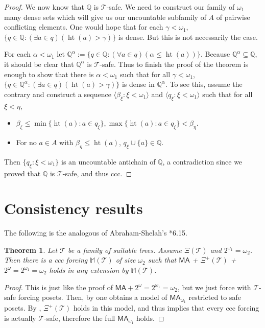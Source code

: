 \documentclass[a4paper,noamsfonts]{amsart}
\newtheorem{theorem}{Theorem}[section]
\theoremstyle{definition}
\newcommand{\Q}{\mathbb{Q}}
\newcommand{\seb}{\subseteq}
\newcommand{\tup}[1]{\langle#1\rangle}
\newcommand{\MA}{\textsf{MA}}
\newcommand{\1}{\mathbbm{1}}
\newcommand{\M}{\mathbb{M}}
\newcommand{\T}{\mathcal{T}}
\newcommand{\prop}{\Xi}
\newcommand{\propp}{\prop^{+}}
\DeclareMathOperator{\hht}{ht}
\begin{document}
\begin{proof}
  We now know that $\Q$ is $\T$-safe. We need to construct
  our family of $\omega_{1}$ many dense sets which will give us
  our uncountable subfamily of $A$ of pairwise conflicting elements.
  One would hope that
  for each $\gamma < \omega_{1}$,
  $\{q \in \Q : (\exists a \in q)(\hht(a) > \gamma)\}$ is dense. But this
  is not necessarily the case.

  For each $\alpha < \omega_{1}$ let
  $\Q^{\alpha} := \{q \in \Q : (\forall a \in q)(\alpha \le \hht(a))\}$.
  Because $\Q^{\alpha} \seb \Q$, it should be clear that $\Q^{\alpha}$
  is $\T$-safe. Thus to finish the proof of the theorem
  is enough to show that there is $\alpha < \omega_{1}$ such that
  for all $\gamma < \omega_{1}$,
  $\{q \in \Q^{\alpha} : (\exists a \in q)(\hht(a) > \gamma)\}$
  is dense in $\Q^{\alpha}$. To see this, assume the contrary
  and construct
  a sequence $\tup{\beta_{\xi} : \xi < \omega_{1}}$ and
  $\tup{q_{\xi} : \xi < \omega_{1}}$ such that for all $\xi < \eta$,
  \begin{itemize}
    \item $\beta_{\xi} \le \min\{\hht(a) : a \in q_{\xi}\},
    \max \{\hht(a) : a \in q_{\xi}\} < \beta_{\eta}$.
    \item For no $a \in A$ with $\beta_{\eta} \le \hht(a)$,
    $q_{\xi} \cup \{a\} \in \Q$. 
  \end{itemize}
  Then $\{q_{\xi} : \xi < \omega_{1}\}$ is an uncountable antichain
  of $\Q$, a contradiction since we proved that $\Q$ is $\T$-safe,
  and thus ccc.
\end{proof}

\section{Consistency results}

The following is the analogous of Abraham-Shelah's \cite{ShelahAbraham}*{6.15}.

\begin{theorem}\label{thm:ma+psi}
  Let $\T$ be a family of suitable trees. Assume
  $\prop(\T)$ and $2^{\omega_{1}} = \omega_{2}$.
  Then
  there is a ccc forcing $\M(\T)$ of size $\omega_{2}$
  such that
  $\MA$ + $\propp(\T)$ + $2^{\omega} = 2^{\omega_{1}} = \omega_{2}$
  holds in any extension by
  $\M(\T)$.
\end{theorem}
\begin{proof}
  This is just like the proof of $\MA + 2^{\omega} = 2^{\omega_{1}} = \omega_{2}$,
  but we just force with $\T$-safe forcing posets. Then, by
  one obtains a model
  of $\MA_{\omega_{1}}$ restricted to safe posets. By ,
  $\propp(\T)$ holds in this model,
  and thus  implies that every
  ccc forcing is actually $\T$-safe, therefore the full
  $\MA_{\omega_{1}}$ holds.
\end{proof}
\end{document}
